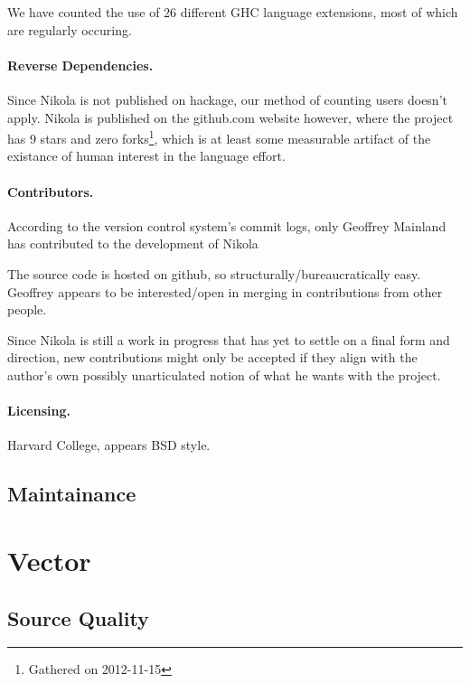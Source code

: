 We have counted the use of 26 different GHC language extensions, most of which
are regularly occuring. 

\paragraph{Reverse Dependencies.} Since Nikola is not published on hackage, our
method of counting users doesn't apply. Nikola is published on the github.com
website however, where the project has 9 stars and zero forks\footnote{Gathered
on 2012-11-15}, which is at least some measurable artifact of the existance of
human interest in the language effort.

\paragraph{Contributors.} According to the version control system's commit
logs, only Geoffrey Mainland has contributed to the development of Nikola

The source code is hosted on github, so structurally/bureaucratically easy.
Geoffrey appears to be interested/open in merging in contributions from other
people. 

Since Nikola is still a work in progress that has yet to settle on a final form
and direction, new contributions might only be accepted if they align with the
author's own possibly unarticulated notion of what he wants with the project.

\paragraph{Licensing.}
Harvard College, appears BSD style. 

\subsection{Maintainance}

\section{Vector}

\subsection{Source Quality}

